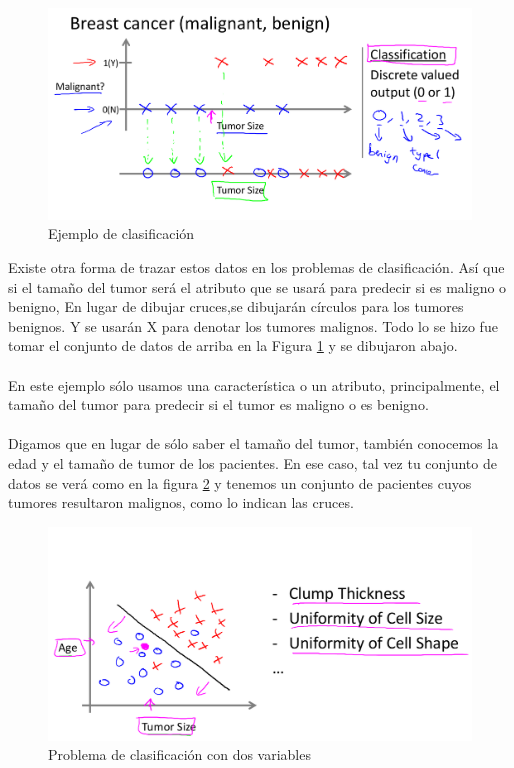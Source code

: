 \documentclass{report}
\begin{document}
\begin{figure}
	\includegraphics[scale=0.35]{img/Ej2}
	\caption{Ejemplo de clasificación}
	\label{fig:Ej2}
\end{figure}

Existe otra forma de trazar estos datos
en los problemas de clasificación.  Así que si el tamaño del tumor será
el atributo que se usará para predecir si es maligno o benigno, En lugar de dibujar cruces,se dibujarán círculos para los tumores benignos. Y se usarán X para denotar los tumores malignos. Todo lo se hizo fue tomar el conjunto de datos de arriba en la Figura \ref{fig:Ej2} y se dibujaron abajo.\\\\ En este ejemplo sólo usamos una característica o un atributo, principalmente, el tamaño del tumor para predecir si el tumor es maligno o es benigno.\\ \\

Digamos que en lugar de sólo saber el tamaño del tumor, también conocemos la
edad y el tamaño de tumor de los pacientes. En ese caso, tal vez tu conjunto de datos se verá como en la figura \ref{fig:Ej3} y tenemos un conjunto de pacientes cuyos tumores resultaron malignos, como lo indican las cruces.\\

\begin{figure}
	\includegraphics[scale=0.35]{img/Ej3}
	\caption{Problema de clasificación con dos variables}
	\label{fig:Ej3}
\end{figure}
\end{document}
